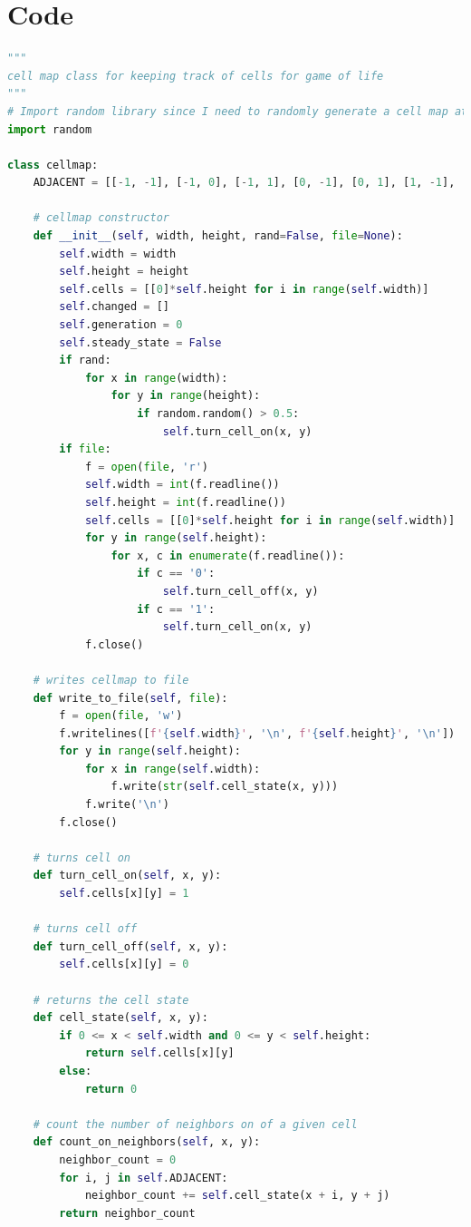 \documentclass[12pt]{report}
\begin{document}
\chapter{Code}
\begin{lstlisting}[language=Python, caption=cell\_map.py]
"""
cell map class for keeping track of cells for game of life
"""
# Import random library since I need to randomly generate a cell map at the start
import random

class cellmap:
    ADJACENT = [[-1, -1], [-1, 0], [-1, 1], [0, -1], [0, 1], [1, -1], [1, 0], [1, 1]]

    # cellmap constructor
    def __init__(self, width, height, rand=False, file=None):
        self.width = width
        self.height = height
        self.cells = [[0]*self.height for i in range(self.width)]
        self.changed = []
        self.generation = 0
        self.steady_state = False
        if rand:
            for x in range(width):
                for y in range(height):
                    if random.random() > 0.5:
                        self.turn_cell_on(x, y)
        if file:
            f = open(file, 'r')
            self.width = int(f.readline())
            self.height = int(f.readline())
            self.cells = [[0]*self.height for i in range(self.width)]
            for y in range(self.height):
                for x, c in enumerate(f.readline()):
                    if c == '0':
                        self.turn_cell_off(x, y)
                    if c == '1':
                        self.turn_cell_on(x, y)
            f.close()
    
    # writes cellmap to file
    def write_to_file(self, file):
        f = open(file, 'w')
        f.writelines([f'{self.width}', '\n', f'{self.height}', '\n'])
        for y in range(self.height):
            for x in range(self.width):
                f.write(str(self.cell_state(x, y)))
            f.write('\n')
        f.close()

    # turns cell on
    def turn_cell_on(self, x, y):
        self.cells[x][y] = 1
    
    # turns cell off
    def turn_cell_off(self, x, y):
        self.cells[x][y] = 0

    # returns the cell state
    def cell_state(self, x, y):
        if 0 <= x < self.width and 0 <= y < self.height:
            return self.cells[x][y]
        else:
            return 0
    
    # count the number of neighbors on of a given cell
    def count_on_neighbors(self, x, y):
        neighbor_count = 0
        for i, j in self.ADJACENT:
            neighbor_count += self.cell_state(x + i, y + j)
        return neighbor_count


\end{lstlisting}
\end{document}
